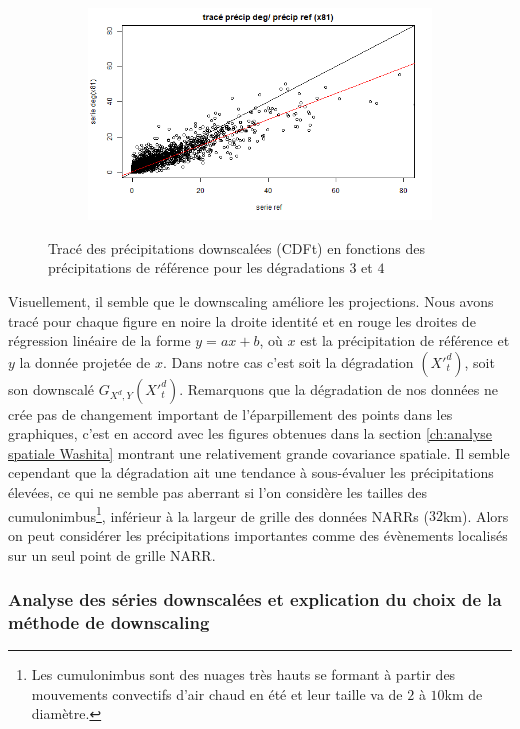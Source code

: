 \documentclass[a4paper,11pt]{article}
\numberwithin{equation}{section}
\begin{document}
\begin{figure}[H]
\begin{subfigure}[b]{0.45\textwidth}
	\end{subfigure}
	\hfill
	\begin{subfigure}[b]{0.45\textwidth}
		\includegraphics[scale=0.35]{images/pr_4_dg.png}
	\end{subfigure}
	\caption{Tracé des précipitations downscalées (CDFt) en fonctions des précipitations de référence pour les dégradations $3$ et $4$}
\end{figure} 

Visuellement, il semble que le downscaling améliore les projections. Nous avons tracé pour chaque figure en noire la droite identité et en rouge les droites de régression linéaire de la forme $y=ax+b$, où $x$ est la précipitation de référence et $y$ la donnée projetée de $x$. Dans notre cas c'est soit la dégradation $(X'^d_t)$, soit son downscalé $G_{X^d,Y}(X'^{d}_t)$. Remarquons que la dégradation de nos données ne crée pas de changement important de l'éparpillement des points dans les graphiques, c'est en accord avec les figures obtenues dans la section \ref{ch:analyse spatiale Washita} montrant une relativement grande covariance spatiale. Il semble cependant que la dégradation ait une tendance à sous-évaluer les précipitations élevées, ce qui ne semble pas aberrant si l'on considère les tailles des cumulonimbus\footnote{Les cumulonimbus sont des nuages très hauts se formant à partir des mouvements convectifs d'air chaud en été et leur taille va de $2$ à $10$km de diamètre.}, inférieur à la largeur de grille des données NARRs ($32$km). Alors on peut considérer les précipitations importantes comme des évènements localisés sur un seul point de grille NARR.


\subsubsection{Analyse des séries downscalées et explication du choix de la méthode de downscaling}
\end{document}

